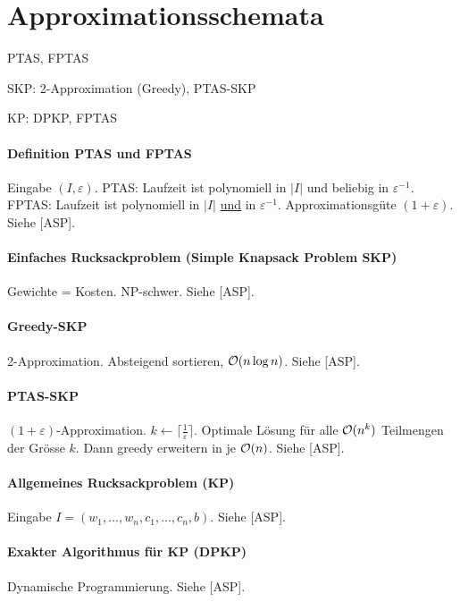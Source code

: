 \section{Approximationsschemata}

\begin{takeaway}
    \item PTAS, FPTAS
    \item SKP: 2-Approximation (Greedy), PTAS-SKP
    \item KP: DPKP, FPTAS
\end{takeaway}

\paragraph{Definition PTAS und FPTAS}
Eingabe $(I, \varepsilon)$.
PTAS: Laufzeit ist polynomiell in $|I|$ und beliebig in $\varepsilon^{-1}$.
FPTAS: Laufzeit ist polynomiell in $|I|$ \underline{und} in $\varepsilon^{-1}$.
Approximationsgüte $(1+\varepsilon)$.
Siehe [ASP].

\paragraph{Einfaches Rucksackproblem (Simple Knapsack Problem SKP)}
Gewichte = Kosten. NP-schwer.
Siehe [ASP].

\paragraph{Greedy-SKP}
2-Approximation. Absteigend sortieren, $\mathcal{O}(n \log n)$.
Siehe [ASP].

\paragraph{PTAS-SKP}
$(1+\varepsilon)$-Approximation.
$k \gets \lceil \frac{1}{\varepsilon} \rceil$.
Optimale Lösung für alle $\mathcal{O}(n^k)$ Teilmengen der Grösse $k$. Dann greedy erweitern in je $\mathcal{O}(n)$.
Siehe [ASP].

\paragraph{Allgemeines Rucksackproblem (KP)}
Eingabe $I = (w_1, ..., w_n, c_1, ..., c_n, b)$.
Siehe [ASP].

\paragraph{Exakter Algorithmus für KP (DPKP)}
Dynamische Programmierung. Siehe [ASP].

